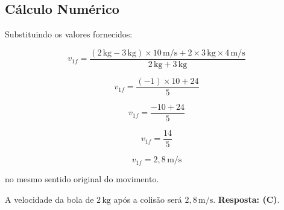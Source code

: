 \begin{flushleft}
\subsection*{Cálculo Numérico}

Substituindo os valores fornecidos:

\[
v_{1f} = \frac{(2\,\text{kg} - 3\,\text{kg}) \times 10\,\text{m/s} + 2 \times 3\,\text{kg} \times 4\,\text{m/s}}{2\,\text{kg} + 3\,\text{kg}}
\]

\[
v_{1f} = \frac{(-1)\times10 + 24}{5}
\]

\[
v_{1f} = \frac{-10 + 24}{5}
\]

\[
v_{1f} = \frac{14}{5}
\]

\[
\boxed{v_{1f} = 2{,}8\,\text{m/s}}
\]

no mesmo sentido original do movimento.

A velocidade da bola de \(2\,\text{kg}\) após a colisão será \(2{,}8\,\text{m/s}\). \textbf{Resposta: \colorbox{green!50}{(C)}}. 

\end{flushleft}


